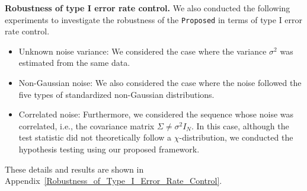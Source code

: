 \textbf{Robustness of type I error rate control.}
We also conducted the following experiments to investigate the robustness of the \texttt{Proposed} in terms of type I error rate control.
\begin{itemize}
  \item Unknown noise variance: We considered the case where the variance $\sigma^2$ was estimated from the same data. 
  \item Non-Gaussian noise: We also considered the case where the noise followed the five types of standardized non-Gaussian distributions.
  \item Correlated noise: Furthermore, we considered the sequence whose noise was correlated, i.e., the covariance matrix $\Sigma \neq \sigma^2 I_N$. 
        In this case, although the test statistic did not theoretically follow a $\chi$-distribution, 
        we conducted the hypothesis testing using our proposed framework.
\end{itemize}
These details and results are shown in Appendix~\ref{Robustness_of_Type_I_Error_Rate_Control}.

